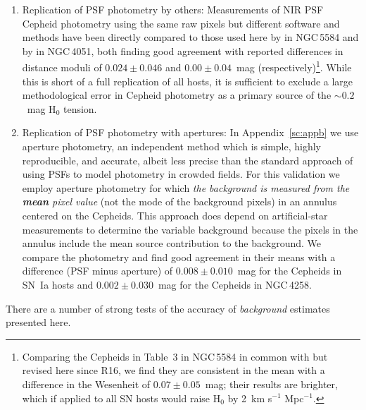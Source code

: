 \documentclass[12pt]{aastex631}
\newcommand{\kms}{km s$^{-1}$ Mpc$^{-1}$}
\begin{document}
\begin{enumerate}
\item Replication of PSF photometry by others: Measurements of NIR PSF Cepheid photometry using the same raw pixels but different software and methods have been directly compared to those used here by \citet{Javanmardi:2021} in NGC$\,$5584 and by \citet{Yuan:2021_N4051} in NGC$\,$4051, both finding good agreement with reported differences in distance moduli of $0.024\pm0.046$ and $0.00\pm0.04$~mag (respectively)\footnote{Comparing the Cepheids in Table~3 in NGC$\,$5584 in common with \citet{Javanmardi:2021} but revised here since R16, we find they are consistent in the mean with a difference in the Wesenheit of $0.07\pm0.05$~mag; their results are brighter, which if applied to all SN hosts would raise H$_0$ by 2~\kms.}.  While this is short of a full replication of all hosts, it is sufficient to exclude a large methodological error in Cepheid photometry as a primary source of the $\sim 0.2$~mag H$_0$ tension.
    
\item Replication of PSF photometry with apertures: In Appendix~\ref{sc:appb} we use aperture photometry, an independent method which is simple, highly reproducible, and accurate, albeit less precise than the standard approach of using PSFs to model photometry in crowded fields. For this validation we employ aperture photometry for which {\it the background is measured from the {\bf mean} pixel value} (not the mode of the background pixels) in an annulus centered on the Cepheids.  This approach does depend on artificial-star measurements to determine the variable background because the pixels in the annulus include the mean source contribution to the background.  We compare the photometry and find good agreement in their means with a difference (PSF minus aperture) of $0.008\pm0.010$~mag for the Cepheids in SN~Ia hosts and $0.002\pm0.030$~mag for the Cepheids in NGC$\,$4258.
\end{enumerate}

There are a number of strong tests of the accuracy of {\it background} estimates presented here.
\end{document}
